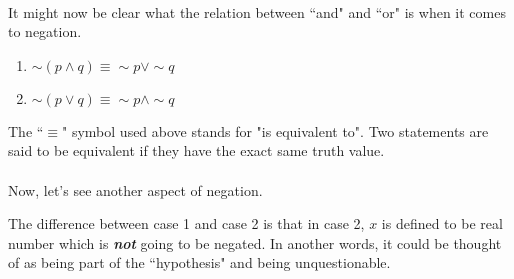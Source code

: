 \hrulefill\\
It might now be clear what the relation between ``and" and ``or" is when it comes to negation.
\begin{enumerate}
    \itemsep0em
    \item $\sim(p\land q) \equiv \sim p \lor \sim q$
    \item $\sim(p\lor q) \equiv \sim p \land \sim q$
\end{enumerate}
The ``$\equiv$" symbol used above stands for "is equivalent to". Two statements are said to be equivalent if they have the exact same truth value.\\~\\
Now, let's see another aspect of negation.
\begin{center}
\end{center}
The difference between case 1 and case 2 is that in case 2, $x$ is defined to be real number which is \textbf{\textit{not}} going to be negated. In another words, it could be thought of as being part of the ``hypothesis" and being unquestionable.

\hrulefill
{}

\hrulefill